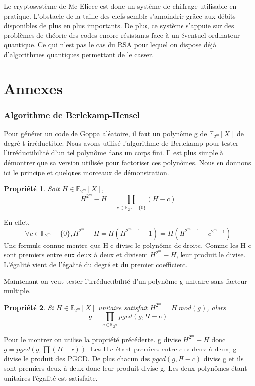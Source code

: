 \documentclass{article}
\newtheorem{prop}{Propriété}
\begin{document}
		Le cryptosystème de Mc Eliece est donc un système de chiffrage utilisable en pratique.
		L'obstacle de la taille des clefs semble s'amoindrir grâce aux débits disponibles de plus en plus importants.
		De plus, ce système s'appuie sur des problèmes de théorie des codes encore résistants face à un éventuel ordinateur quantique.
		Ce qui n'est pas le cas du RSA pour lequel on dispose déjà d'algorithmes quantiques permettant de le casser.




\newpage
\appendix
\part*{Annexes}
	
	\section{Algorithme de Berlekamp-Hensel}
		\label{BH}
		\cite{berlekamp}
		Pour générer un code de Goppa aléatoire, il faut un polynôme g de $ \mathbb{F}_{2^{m}}[X] $ de degré t irréductible.
		Nous avons utilisé l'algorithme de Berlekamp pour tester l'irréductibilité d'un tel polynôme dans un corps fini.
		Il est plus simple à démontrer que sa version utilisée pour factoriser ces polynômes.
		Nous en donnons ici le principe et quelques morceaux de démonstration.

		\begin{prop}
			Soit $H \in \mathbb{F}_{2^{m}}[X]$, 
			$$H^{2^{m}} - H = \prod_{c \in \mathbb{F}_{2^{m}}-\{0\}}(H-c)$$
		\end{prop}
		En effet,
		$$ \forall c \in \mathbb{F}_{2^{m}}-\{0\}, H^{2^{m}}-H = H(H^{2^{m}-1}-1) = H(H^{2^{m}-1}-c^{2^{m}-1})$$
		Une formule connue montre que H-c divise le polynôme de droite.
		Comme les H-c sont premiers entre eux deux à deux et divisent $ H^{2^{m}} -H $, leur produit le divise.
		L'égalité vient de l'égalité du degré et du premier coefficient.

		Maintenant on veut tester l'irréductibilité d'un polynôme g unitaire sans facteur multiple.
		\begin{prop}
			Si $H \in \mathbb{F}_{2^{m}}[X]$ unitaire satisfait $H^{2^{m}} = H \ mod(g)$, alors 
			$$g = \prod_{c\in \mathbb{F}_{2^{m}}}pgcd(g,H-c)$$
		\end{prop}

		Pour le montrer on utilise la propriété précédente.
		g divise $H^{2^{m}} - H$ donc $g = pgcd(g,\prod(H-c))$.
		Les H-c étant premiers entre eux deux à deux, g divise le produit des PGCD.
		De plus chacun des $pgcd(g,H-c)$ divise g et ils sont premiers deux à deux donc leur produit divise g.
		Les deux polynômes étant unitaires l'égalité est satisfaite.
\end{document}
